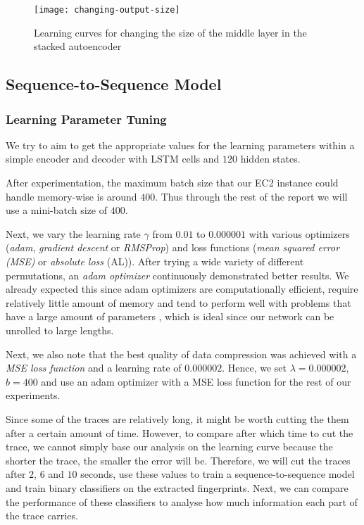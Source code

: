 \begin{figure}[ht]
  \centering
  \texttt{[image: changing-output-size]}
  \caption{Learning curves for changing the size of the middle layer in the stacked autoencoder}
  \label{fig:changing-output-size}
\end{figure}

\newpage

\subsection{Sequence-to-Sequence Model}

\subsubsection{Learning Parameter Tuning}

We try to aim to get the appropriate values for the learning parameters within a simple encoder and decoder with LSTM cells and $120$ hidden states.

After experimentation, the maximum batch size that our EC2 instance could handle memory-wise is around $400$.
Thus through the rest of the report we will use a mini-batch size of $400$.

Next, we vary the learning rate $\gamma$ from $0.01$ to $0.000001$ with various optimizers (\textit{adam}, \textit{gradient descent} or \textit{RMSProp}) and loss functions (\textit{mean squared error (MSE)} or \textit{absolute loss} (AL)).
After trying a wide variety of different permutations, an \textit{adam optimizer} continuously demonstrated better results.
We already expected this since adam optimizers are computationally efficient, require relatively little amount of memory and tend to perform well with problems that have a large amount of parameters \cite{kingma2014adam},
which is ideal since our network can be unrolled to large lengths.

Next, we also note that the best quality of data compression was achieved with a \textit{MSE loss function} and a learning rate of $0.000002$.
Hence, we set $\lambda = 0.000002$, $b = 400$ and use an adam optimizer with a MSE loss function for the rest of our experiments.

Since some of the traces are relatively long, it might be worth cutting the them after a certain amount of time.
However, to compare after which time to cut the trace, we cannot simply base our analysis on the learning curve because the shorter the trace, the smaller the error will be.
Therefore, we will cut the traces after $2$, $6$ and $10$ seconds, use these values to train a sequence-to-sequence model and train binary classifiers on the extracted fingerprints.
Next, we can compare the performance of these classifiers to analyse how much information each part of the trace carries.

